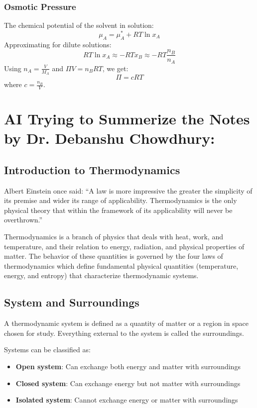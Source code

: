 \documentclass{article}
\theoremstyle{definition}
\begin{document}
\subsubsection{Osmotic Pressure}
The chemical potential of the solvent in solution:
\begin{equation}
    \mu_A = \mu_A^* + RT \ln x_A
\end{equation}
Approximating for dilute solutions:
\begin{equation}
    RT \ln x_A \approx -RT x_B \approx -RT \frac{n_B}{n_A}
\end{equation}
Using \( n_A = \frac{V}{M_A} \) and \( \Pi V = n_B RT \), we get:
\begin{equation}
    \Pi = cRT
\end{equation}
where \( c = \frac{n_B}{V} \).

\section{AI Trying to Summerize the Notes by Dr. Debanshu Chowdhury:}

\subsection{Introduction to Thermodynamics}

Albert Einstein once said: ``A law is more impressive the greater the simplicity of its premise and wider its range of applicability. Thermodynamics is the only physical theory that within the framework of its applicability will never be overthrown.''

Thermodynamics is a branch of physics that deals with heat, work, and temperature, and their relation to energy, radiation, and physical properties of matter. The behavior of these quantities is governed by the four laws of thermodynamics which define fundamental physical quantities (temperature, energy, and entropy) that characterize thermodynamic systems.

\subsection{System and Surroundings}

A thermodynamic system is defined as a quantity of matter or a region in space chosen for study. Everything external to the system is called the surroundings.

Systems can be classified as:
\begin{itemize}
    \item \textbf{Open system}: Can exchange both energy and matter with surroundings
    \item \textbf{Closed system}: Can exchange energy but not matter with surroundings
    \item \textbf{Isolated system}: Cannot exchange energy or matter with surroundings
\end{itemize}
\end{document}
